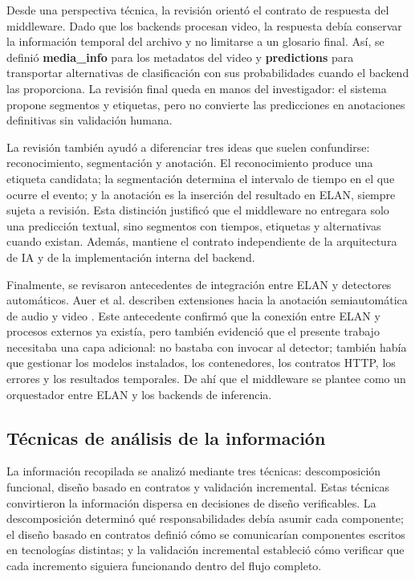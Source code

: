 \documentclass[11pt,a4paper]{article}
\begin{document}
Desde una perspectiva técnica, la revisión orientó el contrato de respuesta del middleware. Dado que los backends procesan video, la respuesta debía conservar la información temporal del archivo y no limitarse a un glosario final. Así, se definió \textbf{media\_info} para los metadatos del video y \textbf{predictions} para transportar alternativas de clasificación con sus probabilidades cuando el backend las proporciona. La revisión final queda en manos del investigador: el sistema propone segmentos y etiquetas, pero no convierte las predicciones en anotaciones definitivas sin validación humana.

La revisión también ayudó a diferenciar tres ideas que suelen confundirse: reconocimiento, segmentación y anotación. El reconocimiento produce una etiqueta candidata; la segmentación determina el intervalo de tiempo en el que ocurre el evento; y la anotación es la inserción del resultado en ELAN, siempre sujeta a revisión. Esta distinción justificó que el middleware no entregara solo una predicción textual, sino segmentos con tiempos, etiquetas y alternativas cuando existan. Además, mantiene el contrato independiente de la arquitectura de IA y de la implementación interna del backend.

Finalmente, se revisaron antecedentes de integración entre ELAN y detectores automáticos. Auer et al. describen extensiones hacia la anotación semiautomática de audio y video \cite{auer2010elan}. Este antecedente confirmó que la conexión entre ELAN y procesos externos ya existía, pero también evidenció que el presente trabajo necesitaba una capa adicional: no bastaba con invocar al detector; también había que gestionar los modelos instalados, los contenedores, los contratos HTTP, los errores y los resultados temporales. De ahí que el middleware se plantee como un orquestador entre ELAN y los backends de inferencia.

\subsection{Técnicas de análisis de la información}

La información recopilada se analizó mediante tres técnicas: descomposición funcional, diseño basado en contratos y validación incremental. Estas técnicas convirtieron la información dispersa en decisiones de diseño verificables. La descomposición determinó qué responsabilidades debía asumir cada componente; el diseño basado en contratos definió cómo se comunicarían componentes escritos en tecnologías distintas; y la validación incremental estableció cómo verificar que cada incremento siguiera funcionando dentro del flujo completo.
\end{document}
